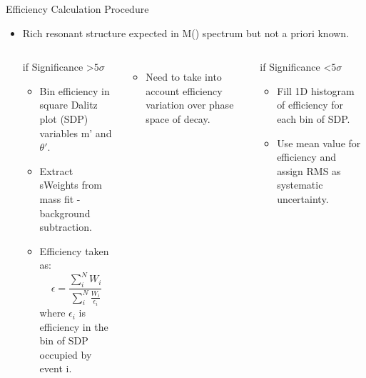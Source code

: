 \documentclass{beamer}
\def\LbpkEtapr {\decay{\Lb}{\proton\kaon\etapr}\xspace}
\begin{document}
\begin{frame}{Efficiency Calculation Procedure}
\begin{itemize}
\item Rich resonant structure expected in M(\proton \Km) spectrum but not a priori known.
  \begin{columns}
    \begin{block}{if Significance \textgreater $5\sigma$}
      \begin{itemize}
      \item Bin efficiency in square Dalitz plot (SDP) variables m' and $\theta'$.
      \item Extract sWeights from mass fit - background subtraction.
      \item Efficiency taken as:
        \begin{equation}
          \epsilon = \frac{\sum_i^{N}W_i}{\sum_i^{N}\frac{W_i}{\epsilon_i}}
        \end{equation}
        where $\epsilon_i$ is efficiency in the bin of SDP occupied by event i.
      \end{itemize}
    \end{block}
    \begin{itemize}
    \item Need to take into account efficiency variation over phase space of \LbpkEtapr decay.
    \end{itemize}
    \begin{block}{if Significance \textless $5\sigma$}
      \begin{itemize}
      \item Fill 1D histogram of efficiency for each bin of SDP.
      \item Use mean value for efficiency and assign RMS as systematic uncertainty.
      \end{itemize}
    \end{block}
  \end{columns}
\end{itemize}
\end{frame}
\end{document}
